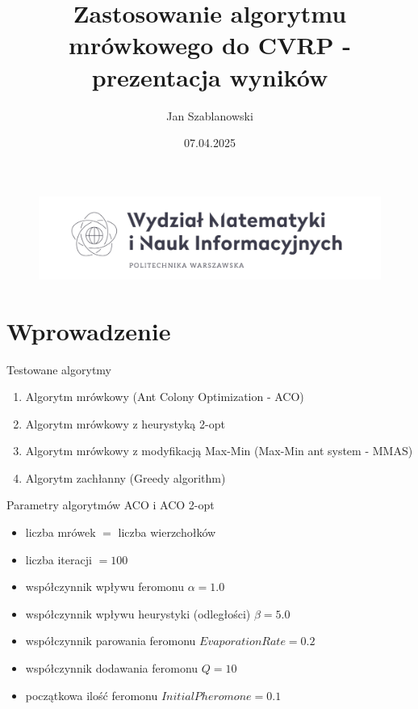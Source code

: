 \documentclass{beamer}
\author{Jan Szablanowski}
\title{Zastosowanie algorytmu mrówkowego do CVRP - prezentacja wyników}
\date{07.04.2025}
\begin{document}
\beamertemplatenavigationsymbolsempty
\begin{frame}[plain]
    \begin{figure}
        \begin{center}
            \includegraphics[width=0.8\linewidth]{img/logo.png}
        \end{center}
    \end{figure}
    \vspace{-4mm}
    \titlepage
\end{frame}


\section*{Wprowadzenie}

\begin{frame}{Testowane algorytmy}
  \begin{enumerate}
    \setlength\itemsep{1em}
    \item Algorytm mrówkowy (Ant Colony Optimization - ACO)
    \item Algorytm mrówkowy z heurystyką 2-opt
    \item Algorytm mrówkowy z modyfikacją Max-Min (Max-Min ant system - MMAS)
    \item Algorytm zachłanny (Greedy algorithm)
  \end{enumerate}
\end{frame}

\begin{frame}{Parametry algorytmów ACO i ACO 2-opt}
    \begin{itemize}
        \setlength\itemsep{1em}
        \item liczba mrówek $=$ liczba wierzchołków
        \item liczba iteracji $= 100$
        \item współczynnik wpływu feromonu $\alpha = 1.0$
        \item współczynnik wpływu heurystyki (odległości) $\beta = 5.0$ 
        \item współczynnik parowania feromonu $EvaporationRate = 0.2$
        \item współczynnik dodawania feromonu $Q = 10$
        \item początkowa ilość feromonu $InitialPheromone = 0.1$
    \end{itemize}
\end{frame}
\end{document}
